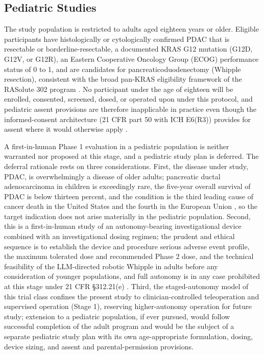 \subsection{Pediatric Studies}

The study population is restricted to adults aged eighteen years or older. Eligible
participants have histologically or cytologically confirmed PDAC that is resectable
or borderline-resectable, a documented KRAS G12 mutation (G12D, G12V, or G12R), an
Eastern Cooperative Oncology Group (ECOG) performance status of 0 to 1, and are
candidates for pancreaticoduodenectomy (Whipple resection), consistent with the
broad pan-KRAS eligibility framework of the RASolute 302 program
\cite{daraxwhipple}. No participant under the age of eighteen will be enrolled,
consented, screened, dosed, or operated upon under this protocol, and pediatric
assent provisions are therefore inapplicable in practice even though the
informed-consent architecture (21 CFR part 50 with ICH E6(R3)) provides for assent
where it would otherwise apply \cite{cfr050paiuni}.

A first-in-human Phase 1 evaluation in a pediatric population is neither warranted
nor proposed at this stage, and a pediatric study plan is deferred. The deferral
rationale rests on three considerations. First, the disease under study, PDAC, is
overwhelmingly a disease of older adults; pancreatic ductal adenocarcinoma in
children is exceedingly rare, the five-year overall survival of PDAC is below
thirteen percent, and the condition is the third leading cause of cancer death in
the United States and the fourth in the European Union \cite{pdac060s2030}, so the
target indication does not arise materially in the pediatric population. Second,
this is a first-in-human study of an autonomy-bearing investigational device
combined with an investigational dosing regimen; the prudent and ethical sequence
is to establish the device and procedure serious adverse event profile, the maximum
tolerated dose and recommended Phase 2 dose, and the technical feasibility of the
LLM-directed robotic Whipple in adults before any consideration of younger
populations, and full autonomy is in any case prohibited at this stage under 21 CFR
\S 312.21(e) \cite{cfr312paiuni}. Third, the staged-autonomy model of this trial
class confines the present study to clinician-controlled teleoperation and
supervised operation (Stage 1), reserving higher-autonomy operation for future
study; extension to a pediatric population, if ever pursued, would follow
successful completion of the adult program and would be the subject of a separate
pediatric study plan with its own age-appropriate formulation, dosing, device
sizing, and assent and parental-permission provisions.

